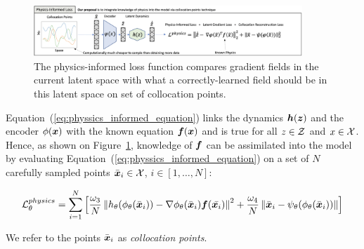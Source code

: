 \begin{figure}
    \centering
    \includegraphics[width=0.9\textwidth]{figures/abstract_physics_informed.png}
    \caption{The physics-informed loss function compares gradient fields in the current latent space with what a correctly-learned field should be in this latent space on set of collocation points.}
    \label{fig:physics_informed_loss}
\end{figure}

Equation~(\ref{eq:physsics_informed_equation}) links the dynamics $\boldsymbol{h}(\boldsymbol{z})$ and the encoder $\phi(\boldsymbol{x})$ with the known equation $\boldsymbol{f}(\boldsymbol{x})$ and is true for all $z \in \operatorname{\mathcal{Z}}$ and $x \in \operatorname{\mathcal{X}}$. Hence, as shown on Figure~\ref{fig:physics_informed_loss}, knowledge of $\boldsymbol{f}$ can be assimilated into the model by evaluating Equation~(\ref{eq:physsics_informed_equation}) on a set of $N$ carefully sampled points $\bar{\boldsymbol{x}}_i \in \operatorname{\mathcal{X}}$, $i \in [1, \dots, N]$:

\begin{equation}
    \label{eq:loss_physics_informed}
    \operatorname{\mathcal{L}}^{physics}_\theta = \sum_{i = 1}^N \left[\frac{\omega_3}{N}\left\|h_\theta(\phi_\theta(\bar{\boldsymbol{x}}_i)) - \nabla \phi_\theta(\bar{\boldsymbol{x}}_i) \boldsymbol{f}(\bar{\boldsymbol{x}_i})\right\|^2 + \frac{\omega_4}{N}\left\|\bar{\boldsymbol{x}}_i - \psi_\theta(\phi_\theta(\bar{\boldsymbol{x}}_i))\right\|\right]
\end{equation}

We refer to the points $\bar{\boldsymbol{x}}_i$ as \textit{collocation points}.

